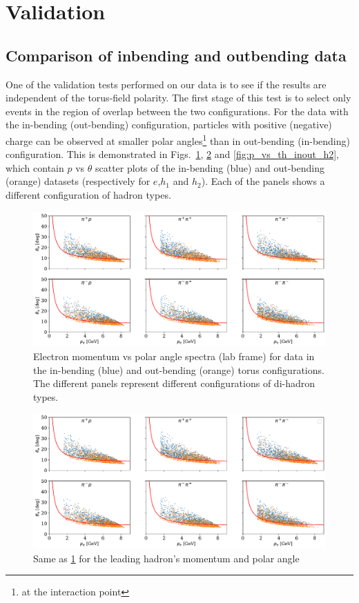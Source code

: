 \section{Validation}
\subsection{Comparison of inbending and outbending data}
One of the validation tests performed on our data is to see if the results are independent of the torus-field polarity.  The first stage of this test is to select only events in the region of overlap between the two configurations.  For the data with the in-bending (out-bending) configuration, particles with positive (negative) charge can be observed at smaller polar angles\footnote{at the interaction point} than in out-bending (in-bending) configuration.  This is demonstrated in Figs.~\ref{fig:p_vs_th_inout_e}, \ref{fig:p_vs_th_inout_h1} and \ref{fig:p_vs_th_inout_h2}, which contain $p$ vs $\theta$ scatter plots of the in-bending (blue) and out-bending (orange) datasets (respectively  for $e$,$h_1$ and $h_2$).  Each of the panels shows a different configuration of hadron types.    

\begin{figure}
    \centering
    \includegraphics[width=\textwidth]{p_vs_th_inout_e}
    \caption{Electron momentum vs polar angle spectra (lab frame) for data in the in-bending (blue) and out-bending (orange) torus configurations.  The different panels represent different configurations of  di-hadron types.}
    \label{fig:p_vs_th_inout_e}
\end{figure}

\begin{figure}
    \centering
    \includegraphics[width=\textwidth]{p_vs_th_inout_e}
    \caption{Same as \ref{fig:p_vs_th_inout_e} for the leading hadron's momentum and polar angle}
    \label{fig:p_vs_th_inout_h1}
\end{figure}

